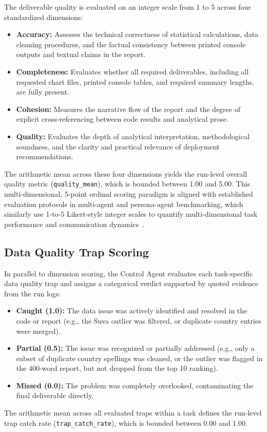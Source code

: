 The deliverable quality is evaluated on an integer scale from 1 to 5 across four standardized dimensions:
\begin{itemize}
    \item \textbf{Accuracy:} Assesses the technical correctness of statistical calculations, data cleaning procedures, and the factual consistency between printed console outputs and textual claims in the report.
    \item \textbf{Completeness:} Evaluates whether all required deliverables, including all requested chart files, printed console tables, and required summary lengths, are fully present.
    \item \textbf{Cohesion:} Measures the narrative flow of the report and the degree of explicit cross-referencing between code results and analytical prose.
    \item \textbf{Quality:} Evaluates the depth of analytical interpretation, methodological soundness, and the clarity and practical relevance of deployment recommendations.
\end{itemize}
The arithmetic mean across these four dimensions yields the run-level overall quality metric (\texttt{quality\_mean}), which is bounded between 1.00 and 5.00.
This multi-dimensional, 5-point ordinal scoring paradigm is aligned with established evaluation protocols in multi-agent and persona-agent benchmarking, which similarly use 1-to-5 Likert-style integer scales to quantify multi-dimensional task performance and communication dynamics~\cite{samuel2025personagymevaluatingpersonaagents, muralidharan2025lessonshumanteamsapplied, jiang2024personallminvestigatingabilitylarge, almutairi2025taifaautomatedfeedback}.

\subsection{Data Quality Trap Scoring}
\label{subsec:trap-scoring}

In parallel to dimension scoring, the Control Agent evaluates each task-specific data quality trap and assigns a categorical verdict supported by quoted evidence from the run logs:
\begin{itemize}
    \item \textbf{Caught (1.0):} The data issue was actively identified and resolved in the code or report (e.g., the Suva outlier was filtered, or duplicate country entries were merged).
    \item \textbf{Partial (0.5):} The issue was recognized or partially addressed (e.g., only a subset of duplicate country spellings was cleaned, or the outlier was flagged in the 400-word report, but not dropped from the top 10 ranking).
    \item \textbf{Missed (0.0):} The problem was completely overlooked, contaminating the final deliverable directly.
\end{itemize}
The arithmetic mean across all evaluated traps within a task defines the run-level trap catch rate (\texttt{trap\_catch\_rate}), which is bounded between 0.00 and 1.00.

